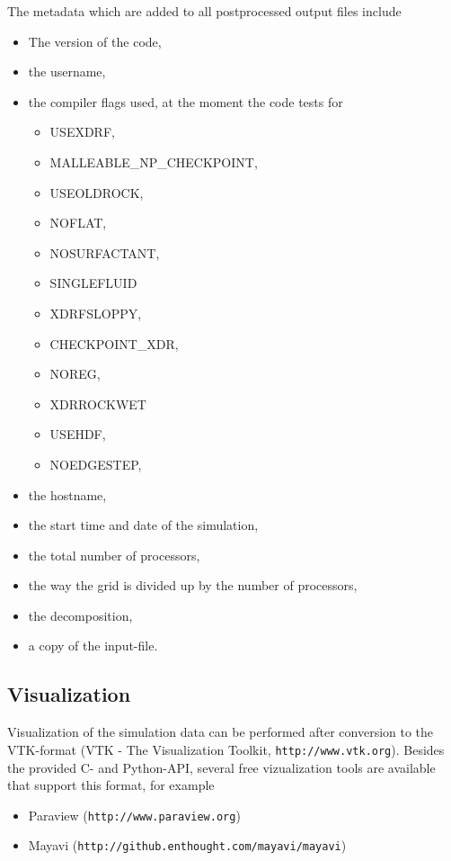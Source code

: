 \documentclass[a4paper]{article}
\begin{document}
The metadata which are added to all postprocessed output files include
\begin{itemize}
\item The version of the code,
\item the username,
\item the compiler flags used, at the moment the code tests for
 \begin{itemize}
  \item USEXDRF,
  \item MALLEABLE\_NP\_CHECKPOINT,
  \item USEOLDROCK,
  \item NOFLAT,
  \item NOSURFACTANT,
  \item SINGLEFLUID
  \item XDRFSLOPPY,
  \item CHECKPOINT\_XDR,
  \item NOREG,
  \item XDRROCKWET
  \item USEHDF,
  \item NOEDGESTEP,
 \end{itemize}
\item the hostname,
\item the start time and date of the simulation,
\item the total number of processors,
\item the way the grid is divided up by the number of processors,
\item the decomposition,
\item a copy of the input-file.
\end{itemize}

\subsection{Visualization}

Visualization of the simulation data can be performed after conversion to the VTK-format (VTK - The Visualization Toolkit, {\tt http://www.vtk.org}). Besides the provided C- and Python-API, several free vizualization tools are available that support this format, for example
\begin{itemize}
\item Paraview ({\tt http://www.paraview.org})
\item Mayavi ({\tt http://github.enthought.com/mayavi/mayavi})
\end{itemize}
\end{document}
